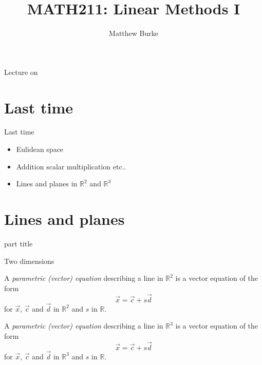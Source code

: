 \documentclass{beamer}
\title{MATH211: Linear Methods I}
\author{Matthew Burke}
\date{\lectureDate}
\newcommand{\lectureDate}{\formatdate{11}{10}{2018}}
\begin{document}
\frame{\titlepage}

\begin{frame}{Lecture on \lectureDate}
  \tableofcontents
\end{frame}

\section*{Last time}
\label{sec:Last-time}

\begin{frame}{Last time}
  \begin{itemize}
  \item Eulidean space\vfill
  \item Addition scalar multiplication etc..\vfill
  \item Lines and planes in $\mathbb R^2$ and $\mathbb R^3$
  \end{itemize}
\end{frame}

\section{Lines and planes}

\begin{frame}
  \begin{beamercolorbox}[sep=12pt,center]{part title}
    \insertsection\par
  \end{beamercolorbox}
\end{frame}

\begin{frame}{Two dimensions}
  \begin{definition}
    A \emph{parametric (vector) equation} describing a line in $\mathbb R^2$ is a vector equation of the form
    \begin{equation*}
      \vec{x} = \vec{c}+s\vec{d}
    \end{equation*}
    for $\vec{x}$, $\vec{c}$ and $\vec{d}$ in $\mathbb R^2$ and $s$ in $\mathbb R$.
  \end{definition}\vfill
  \begin{definition}
    A \emph{parametric (vector) equation} describing a line in $\mathbb R^3$ is a vector equation of the form
    \begin{equation*}
      \vec{x} = \vec{c}+s\vec{d}
    \end{equation*}
    for $\vec{x}$, $\vec{c}$ and $\vec{d}$ in $\mathbb R^3$ and $s$ in $\mathbb R$.
  \end{definition}
\end{frame}
\end{document}
